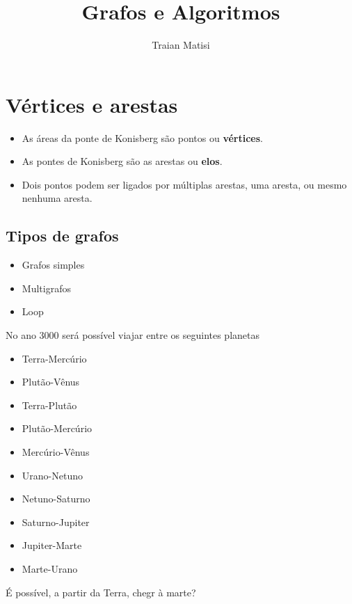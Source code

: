 \documentclass[12pt,a4paper]{article} %
\author{Traian Matisi}
\title{Grafos e Algoritmos}
\begin{document}
\maketitle
\section{Vértices e arestas}
\begin{itemize}
\item As áreas da ponte de Konisberg são pontos ou \textbf{vértices}.
\item As pontes de Konisberg são as arestas ou \textbf{elos}.
\item Dois pontos podem ser ligados por múltiplas arestas, uma aresta, ou mesmo nenhuma aresta.
\end{itemize}
\subsection{Tipos de grafos}
\begin{itemize}
\item Grafos simples
\item Multigrafos
\item Loop
\end{itemize}
No ano 3000 será possível viajar entre os seguintes planetas
\begin{itemize}
\item Terra-Mercúrio
\item Plutão-Vênus
\item Terra-Plutão
\item Plutão-Mercúrio
\item Mercúrio-Vênus
\item Urano-Netuno
\item Netuno-Saturno
\item Saturno-Jupiter
\item Jupiter-Marte
\item Marte-Urano
\end{itemize}
É possível, a partir da Terra, chegr à marte?
\end{document}
